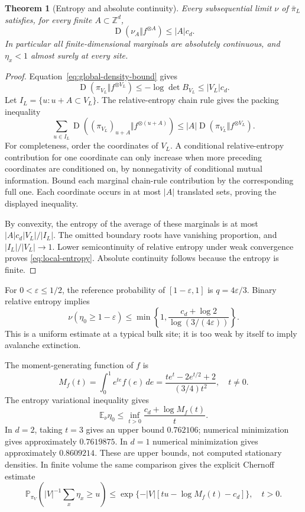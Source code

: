 \documentclass[11pt]{article}
\numberwithin{equation}{section}
\newtheorem{theorem}{Theorem}[section]
\theoremstyle{definition}
\newcommand{\E}{\mathbb E}
\newcommand{\Prob}{\mathbb P}
\newcommand{\Z}{\mathbb Z}
\newcommand{\KL}{\operatorname{D}}
\begin{document}
\begin{theorem}[Entropy and absolute continuity]\label{thm:entropy}
Every subsequential limit $\nu$ of $\bar\pi_L$ satisfies, for every finite $A\subset\Z^d$,
\begin{equation}\label{eq:local-entropy}
 \KL(\nu_A\Vert f^{\otimes A})\le |A|c_d.
\end{equation}
In particular all finite-dimensional marginals are absolutely continuous, and $\eta_x<1$ almost surely at every site.
\end{theorem}
\begin{proof}
Equation~\eqref{eq:global-density-bound} gives
\[
 \KL(\pi_{V_L}\Vert f^{\otimes V_L})\le-\log\det B_{V_L}\le|V_L|c_d.
\]
Let $I_L=\{u:u+A\subset V_L\}$. The relative-entropy chain rule gives the packing inequality
\[
 \sum_{u\in I_L}\KL((\pi_{V_L})_{u+A}\Vert f^{\otimes(u+A)})
 \le |A|\KL(\pi_{V_L}\Vert f^{\otimes V_L}).
\]
For completeness, order the coordinates of $V_L$. A conditional relative-entropy contribution for one coordinate can only increase when more preceding coordinates are conditioned on, by nonnegativity of conditional mutual information. Bound each marginal chain-rule contribution by the corresponding full one. Each coordinate occurs in at most $|A|$ translated sets, proving the displayed inequality.

By convexity, the entropy of the average of these marginals is at most $|A|c_d|V_L|/|I_L|$. The omitted boundary roots have vanishing proportion, and $|I_L|/|V_L|\to1$. Lower semicontinuity of relative entropy under weak convergence proves \eqref{eq:local-entropy}. Absolute continuity follows because the entropy is finite.
\end{proof}

For $0<\varepsilon\le1/2$, the reference probability of $[1-\varepsilon,1]$ is $q=4\varepsilon/3$. Binary relative entropy implies
\begin{equation}\label{eq:threshold-bound}
 \nu(\eta_0\ge1-\varepsilon)
 \le \min\left\{1,\frac{c_d+\log2}{\log(3/(4\varepsilon))}\right\}.
\end{equation}
This is a uniform estimate at a typical bulk site; it is too weak by itself to imply avalanche extinction.

The moment-generating function of $f$ is
\[
 M_f(t)=\int_0^1e^{te}f(e)\,de
 =\frac{te^t-2e^{t/2}+2}{(3/4)t^2},\quad t\ne0.
\]
The entropy variational inequality gives
\begin{equation}\label{eq:mean-bound}
 \E_\nu\eta_0\le\inf_{t>0}\frac{c_d+\log M_f(t)}t.
\end{equation}
In $d=2$, taking $t=3$ gives an upper bound $0.762106$; numerical minimization gives approximately $0.7619875$. In $d=1$ numerical minimization gives approximately $0.8609214$. These are upper bounds, not computed stationary densities. In finite volume the same comparison gives the explicit Chernoff estimate
\[
 \Prob_{\pi_V}\left(|V|^{-1}\sum_x\eta_x\ge u\right)
 \le\exp\{-|V|[tu-\log M_f(t)-c_d]\},\quad t>0.
\]
\end{document}
